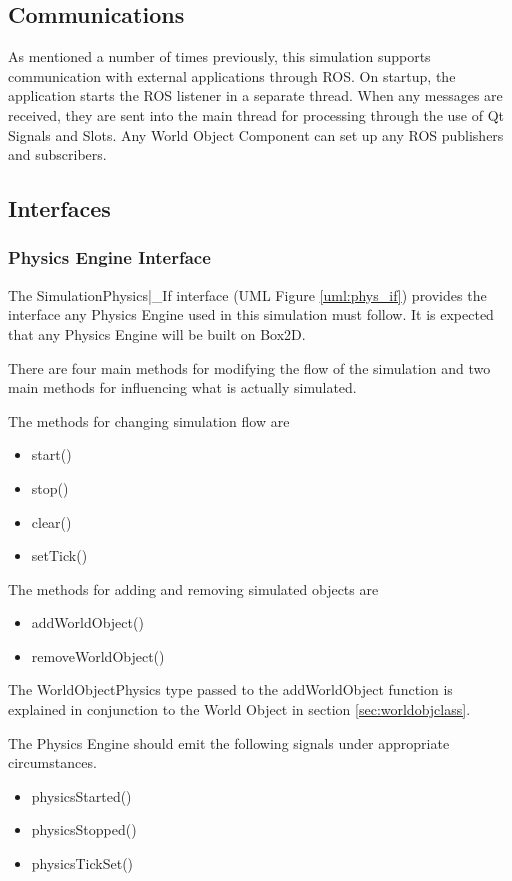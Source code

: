  \subsection{Communications}
 As mentioned a number of times previously, this simulation supports communication with external applications through ROS. On startup, the application starts the ROS listener in a separate thread. When any messages are received, they are sent into the main thread for processing through the use of Qt Signals and Slots. Any World Object Component can set up any ROS publishers and subscribers.
    
  \subsection{Interfaces}
  \subsubsection{Physics Engine Interface}
  The SimulationPhysics|_If interface (UML Figure \ref{uml:phys_if}) provides the interface any Physics Engine used in this simulation must follow. It is expected that any Physics Engine will be built on Box2D.
  
  There are four main methods for modifying the flow of the simulation and two main methods for influencing what is actually simulated.
  
  The methods for changing simulation flow are
  \begin{itemize}
  	\item start()
  	\item stop()
  	\item clear()
  	\item setTick()
  \end{itemize}
  
  The methods for adding and removing simulated objects are
  \begin{itemize}
  	\item addWorldObject()
  	\item removeWorldObject()
  \end{itemize}
  The WorldObjectPhysics type passed to the addWorldObject function is explained in conjunction to the World Object in section \ref{sec:worldobjclass}.
  
  The Physics Engine should emit the following signals under appropriate circumstances.
  \begin{itemize}
  	\item physicsStarted()
  	\item physicsStopped()
  	\item physicsTickSet()
  \end{itemize}
  
